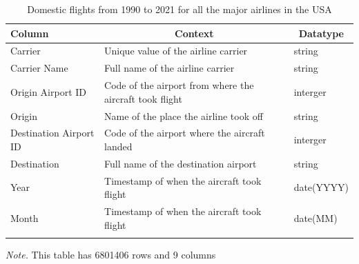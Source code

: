 \documentclass[
  man,floatsintext]{apa7}
\begin{document}
\begin{table}[tbp]

\begin{center}
\begin{threeparttable}

\caption{\label{tab:aviation-flights}Domestic flights from 1990 to 2021 for all the major airlines in the USA}

\begin{tabular}{lll}
\toprule
Column & \multicolumn{1}{c}{Context} & \multicolumn{1}{c}{Datatype}\\
\midrule
Carrier & Unique value of the airline carrier & string\\
Carrier Name & Full name of the airline carrier & string\\
Origin Airport ID & Code of the airport from where the aircraft took flight & interger\\
Origin & Name of the place the airline took off & string\\
Destination Airport ID & Code of the airport where the aircraft landed & interger\\
Destination & Full name of the destination airport & string\\
Year & Timestamp of when the aircraft took flight & date(YYYY)\\
Month & Timestamp of when the aircraft took flight & date(MM)\\
\bottomrule
\addlinespace
\end{tabular}

\begin{tablenotes}[para]
\normalsize{\textit{Note.} This table has 6801406 rows and 9 columns}
\end{tablenotes}

\end{threeparttable}
\end{center}

\end{table}
\end{document}
